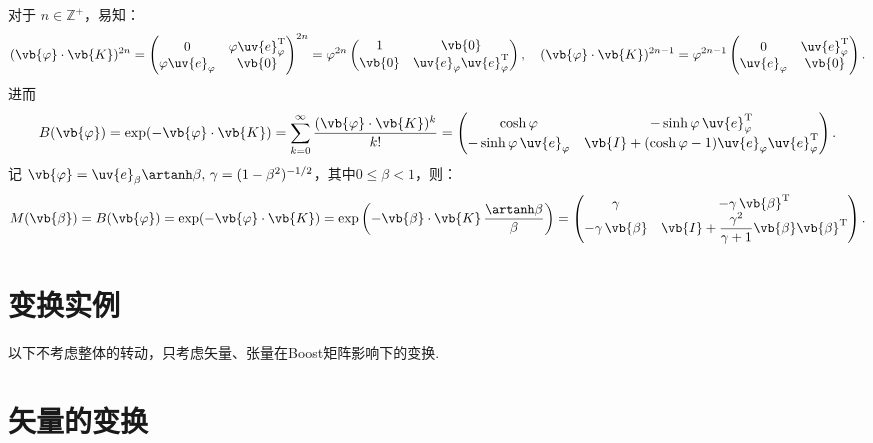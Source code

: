 对于 \(n \in \mathbb{Z}^+\)，易知：
\begin{align*}
	(\vb{\varphi} \cdot \vb{K})^{2n} = \begin{pmatrix}
		0                      & \varphi \uv{e}_\varphi^\mathrm{T} \\
		\varphi \uv{e}_\varphi & \vb{0}
	\end{pmatrix}^{2n} = \varphi^{2n} \begin{pmatrix}
		1      & \vb{0}                                   \\
		\vb{0} & \uv{e}_\varphi \uv{e}_\varphi^\mathrm{T}
	\end{pmatrix},\quad
	(\vb{\varphi} \cdot \vb{K})^{2n-1} = \varphi^{2n-1} \begin{pmatrix}
		0              & \uv{e}_\varphi^\mathrm{T} \\
		\uv{e}_\varphi & \vb{0}
	\end{pmatrix}.
\end{align*}
进而
\begin{align*}
	B(\vb{\varphi}) = \exp(-\vb{\varphi} \cdot \vb{K}) = \sum_{k=0}^\infty \dfrac{(\vb{\varphi} \cdot \vb{K})^k}{k!} = \begin{pmatrix}
		\cosh\varphi                    & -\sinh\varphi \, \uv{e}_\varphi^\mathrm{T}                           \\
		-\sinh\varphi \, \uv{e}_\varphi & \vb{I} + (\cosh\varphi - 1) \uv{e}_\varphi \uv{e}_\varphi^\mathrm{T}
	\end{pmatrix}.
\end{align*}
记 \(\vb{\varphi} = \uv{e}_\beta \artanh\beta,\,\gamma = (1 - \beta^2)^{-1/2}\)，其中\(0 \leq \beta < 1\)，则：
\begin{align*}
	M(\vb{\beta}) = B(\vb{\varphi}) = \exp(-\vb{\varphi} \cdot \vb{K}) = \exp\left( -\vb{\beta} \cdot \vb{K}\, \dfrac{\artanh\beta}{\beta} \right) = \begin{pmatrix}
		\gamma                & -\gamma \, \vb{\beta}^\mathrm{T}                                       \\
		-\gamma \, \vb{\beta} & \vb{I} + \dfrac{\gamma^2}{\gamma + 1} \vb{\beta} \vb{\beta}^\mathrm{T}
	\end{pmatrix}.
\end{align*}

\section{变换实例}
以下不考虑整体的转动，只考虑矢量、张量在Boost矩阵影响下的变换.
\section{矢量的变换}

